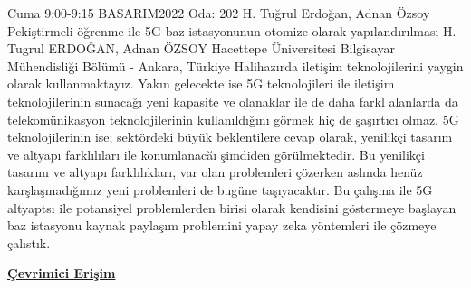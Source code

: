 
    \begin{abstract_basarim}
    {Cuma 9:00-9:15}
    {BASARIM2022}
    {Oda: 202}
    {H. Tuğrul Erdoğan, Adnan Özsoy}
    {Pekiştirmeli öğrenme ile 5G baz istasyonunun otomize olarak yapılandırılması}
    {%
    H. Tugrul ERDOĞAN, Adnan ÖZSOY}
    {%
    }
    {%
    Hacettepe Üniversitesi Bilgisayar Mühendisliği Bölümü - Ankara, Türkiye}
    Halihazırda iletişim teknolojilerini yaygin olarak kullanmaktayız. Yakın gelecekte ise 5G teknolojileri ile iletişim teknolojilerinin sunacağı yeni kapasite ve olanaklar ile de daha farkl alanlarda da telekomünikasyon teknolojilerinin kullanıldığını görmek hiç de şaşırtıcı olmaz. 5G teknolojilerinin ise; sektördeki büyük beklentilere cevap olarak, yenilikçi tasarım ve altyapı farklılıları ile konumlanacă̆ı şimdiden görülmektedir. Bu yenilikçi tasarım ve altyapı farklılıkları, var olan problemleri çözerken aslında henüz karşlaşmadığımız yeni problemleri de bugüne taşıyacaktır. Bu çalışma ile 5G altyaptsı ile potansiyel problemlerden birisi olarak kendisini göstermeye başlayan baz istasyonu kaynak paylaşım problemini yapay zeka yöntemleri ile çözmeye çalıstık. 
    
     \newline\newline\noindent \href{https://drive.google.com/file/d/16QuGSE00RtJch8gNm9T0chTn0ngW98mT/view?usp=drivesdk}{\bfseries Çevrimici Erişim}
    \end{abstract_basarim}
    